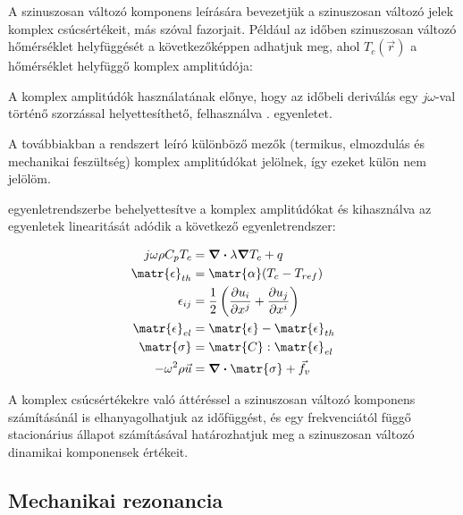A szinuszosan változó komponens leírására bevezetjük a szinuszosan változó jelek komplex csúcsértékeit, más szóval fazorjait. Például az időben szinuszosan változó hőmérséklet helyfüggését a következőképpen adhatjuk meg, ahol $T_c(\vec{r})$ a hőmérséklet helyfüggő komplex amplitúdója:


A komplex amplitúdók használatának előnye, hogy az időbeli deriválás egy $j\omega$-val történő szorzással helyettesíthető, felhasználva . egyenletet.


A továbbiakban a rendszert leíró különböző mezők (termikus, elmozdulás és mechanikai feszültség) komplex amplitúdókat jelölnek, így ezeket külön nem jelölöm.

 egyenletrendszerbe behelyettesítve a komplex amplitúdókat és kihasználva az egyenletek linearitását adódik a következő egyenletrendszer:

\begin{equation}\label{eqn:thermomechanical_eqs_complex}
    \begin{split}
        j \omega \rho C_p T_c &= \div\lambda \grad T_c + q \\
        \matr{\epsilon}_{th} &= \matr{\alpha}(T_c-T_{ref}) \\
        \epsilon_{ij} &= \frac{1}{2}\left(\frac{\partial u_i}{\partial x^j}+\frac{\partial u_j}{\partial x^i}\right) \\
        \matr{\epsilon}_{el} &= \matr{\epsilon} - \matr{\epsilon}_{th} \\
        \matr{\sigma} &= \matr{C} : \matr{\epsilon}_{el} \\
        - \omega^2 \rho \vec{u} &= \div\matr{\sigma} + \vec{f}_v
    \end{split}
\end{equation}

A komplex csúcsértékekre való áttéréssel a szinuszosan változó komponens számításánál is elhanyagolhatjuk az időfüggést, és egy frekvenciától függő stacionárius állapot számításával határozhatjuk meg a szinuszosan változó dinamikai komponensek értékeit.

\subsection{Mechanikai rezonancia}

